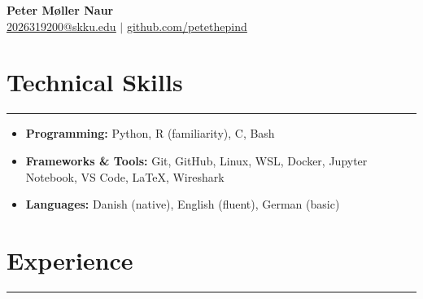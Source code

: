 \documentclass[letterpaper,10pt]{article}
\begin{document}
\begin{center}
    \textbf{\LARGE Peter Møller Naur}\\
    \vspace{3pt}
    \vspace{2pt}
    \href{mailto:yourmail@example.com}
    {\underline{2026319200@skku.edu}}
    $|$
    \href{https://github.com/petethepind}
    {\underline{github.com/petethepind}}
\end{center}

\section*{Technical Skills}
\hrule
\vspace{5pt}

\begin{itemize}
    \item[] \textbf{Programming:}
    Python, R (familiarity), C, Bash

    \item[] \textbf{Frameworks \& Tools:}
    Git, GitHub, Linux, WSL, Docker,
    Jupyter Notebook, VS Code, LaTeX,
    Wireshark

    \item[] \textbf{Languages:}
    Danish (native), English (fluent), German (basic)
\end{itemize}

\section*{Experience}
\hrule
\vspace{5pt}
\end{document}
